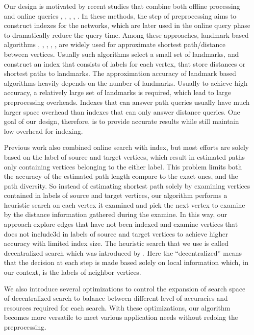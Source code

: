 Our design is motivated by recent studies that combine both offline processing and online queries \cite{Potamias:2009:FSP:1645953.1646063}, \cite{tretyakov2011fast}, \cite{Akiba:2012:SQC:2247596.2247614}, \cite{6399472}, \cite{Jin:2012:HLA:2213836.2213887}. In these methods, the step of preprocessing aims to construct indexes for the networks, which are later used in the online query phase to dramatically reduce the query time. Among these approaches, landmark based algorithms \cite{Thorup:2005:ADO:1044731.1044732}, \cite{Goldberg:2005:CSP:1070432.1070455}, \cite{Potamias:2009:FSP:1645953.1646063}, \cite{Gubichev:2010:FAE:1871437.1871503}, \cite{tretyakov2011fast}, \cite{6399472}are widely used for approximate shortest path/distance between vertices. Usually such algorithms select a small set of landmarks, and construct an index that consists of labels for each vertex, that store distances or shortest paths to landmarks. The approximation accuracy of landmark based algorithms heavily depends on the number of landmarks. Usually to achieve high accuracy, a relatively large set of landmarks is required, which lead to large preprocessing overheads. Indexes that can answer path queries usually have much larger space overhead than indexes that can only answer distance queries. One goal of our design, therefore, is to provide accurate results while still maintain low overhead for indexing.

Previous work also combined online search with index, but most efforts are solely based on the label of source and target vertices, which result in estimated paths only containing vertices belonging to the either label. This problem limits both the accuracy of the estimated path length compare to the exact ones, and the path diversity. So instead of estimating shortest path solely by examining vertices contained in labels of source and target vertices, our algorithm performs a heuristic search on each vertex it examined and pick the next vertex to examine by the distance information gathered during the examine. In this way, our approach explore edges that have not been indexed and examine vertices that does not include3d in labels of source and target vertices to achieve higher accuracy with limited index size. The heuristic search that we use is called decentralized search which was introduced by \cite{Kleinberg:2000p5066}. Here the ``decentralized'' means that the decision at each step is made based solely on local information which, in our context, is the labels of neighbor vertices.

We also introduce several optimizations to control the expansion of search space of decentralized search to balance between different level of accuracies and resources required for each search. With these optimizations, our algorithm becomes more versatile to meet various application needs without redoing the preprocessing.  

